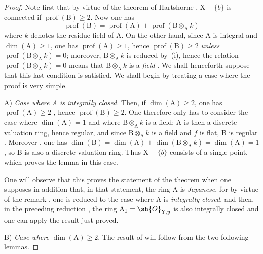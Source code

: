 \begin{proof}
Note first that by virtue of the theorem of Hartshorne , $\mathrm{X}-\{b\}$ is connected if $\operatorname{prof}(\mathrm{B})\geq 2$.
Now one has 
\begin{equation}
  \operatorname{prof}(\mathrm{B})=\operatorname{prof}(\mathrm{A})+\operatorname{prof}(\mathrm{B}\otimes_{\mathrm{A}}k)
  \label{IV.18.9.7.4}
\tag{18.9.7.4}
\end{equation}
where $k$ denotes the residue field of A.
On the other hand, since A is integral and $\dim(\mathrm{A})\geq 1$, one has $\operatorname{prof}(\mathrm{A})\geq 1$, hence $\operatorname{prof}(\mathrm{B})\geq 2$ \emph{unless} $\operatorname{prof}(\mathrm{B}\otimes_{\mathrm{A}}k)=0$;
moreover, $\mathrm{B}\otimes_{\mathrm{A}}k$ is reduced by~(i), hence the relation $\operatorname{prof}(\mathrm{B}\otimes_{\mathrm{A}}k)=0$ means that $\mathrm{B}\otimes_{\mathrm{A}}k$ is a \emph{field} .
We shall henceforth suppose that this last condition is satisfied.
We shall begin by treating a case where the proof is very simple.

A) \emph{Case where A is integrally closed.}
Then, if $\dim(\mathrm{A})\geq 2$, one has $\operatorname{prof}(\mathrm{A})\geq 2$ , hence $\operatorname{prof}(\mathrm{B})\geq 2$.
One therefore only has to consider the case where $\dim(\mathrm{A})=1$ and where $\mathrm{B}\otimes_{\mathrm{A}}k$ is a field;
A is then a discrete valuation ring, hence regular, and since $\mathrm{B}\otimes_{\mathrm{A}}k$
is a field and $f$ is flat, B is regular .
Moreover , one has $\dim(\mathrm{B})=\dim(\mathrm{A})+\dim(\mathrm{B}\otimes_{\mathrm{A}}k)=\dim(\mathrm{A})=1$, so B is also a discrete valuation ring.
Thus $\mathrm{X}-\{b\}$ consists of a single point, which proves the lemma  in this case.

One will observe that this proves the statement of the theorem  when one supposes in addition that, in that statement, the ring A is \emph{Japanese}, for by virtue of the remark , one is reduced to the case where A is \emph{integrally closed}, and then, in the preceding reduction , the ring $\mathrm{A}_1=\sh{O}_{\mathrm{Y},y}$ is also integrally closed and one can apply the result just proved.

B) \emph{Case where} $\dim(\mathrm{A})\geq 2$.
The result of  will follow from the two following lemmas.
\end{proof}

